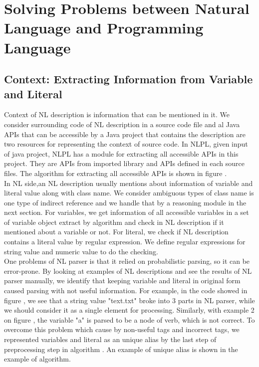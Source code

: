 \section{Solving Problems between Natural Language and Programming Language}
\subsection{Context: Extracting Information from Variable and Literal}
Context of NL description is information that can be mentioned in it. We consider surrounding code of NL description in a source code file and al Java APIs that can be accessible by a Java project that contains the description are two resources for representing the context of source code. In NLPL, given input of java project, NLPL has a module for extracting all accessible APIs in this project. They are APIs from imported library and APIs defined in each source files. The algorithm for extracting all accessible APIs is shown in figure \cite{}. \\
In NL side,an NL description usually mentions about information of variable and literal value along with class name. We consider ambiguous types of class name is one type of indirect reference and we handle that by a reasoning module in the next section. For variables, we get information of all accessible variables in a set of variable object extract by algorithm \cite{} and check in NL description if it mentioned about a variable or not. For literal, we check if NL description contains a literal value by regular expression. We define regular expressions for string value and numeric value to do the checking. \\
One problems of NL parser is that it relied on probabilistic parsing, so it can be error-prone. By looking at examples of NL descriptions and see the results of NL parser manually, we identify that keeping variable and literal in original form caused parsing with not useful information. For example, in the code showed in figure \cite{}, we see that a string value "text.txt" broke into 3 parts in NL parser, while we should consider it as a single element for processing. Similarly, with example 2 on figure \cite{}, the variable "a" is parsed to be a node of verb, which is not correct. To overcome this problem which cause by non-useful tags and incorrect tags, we represented variables and literal as an unique alias by the last step of preprocessing step in algorithm \cite{}. An example of unique alias is shown in the example of algorithm.  

